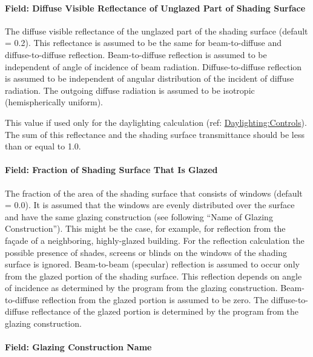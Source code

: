 \paragraph{Field: Diffuse Visible Reflectance of Unglazed Part of Shading Surface}\label{field-diffuse-visible-reflectance-of-unglazed-part-of-shading-surface}

The diffuse visible reflectance of the unglazed part of the shading surface (default = 0.2). This reflectance is assumed to be the same for beam-to-diffuse and diffuse-to-diffuse reflection. Beam-to-diffuse reflection is assumed to be independent of angle of incidence of beam radiation. Diffuse-to-diffuse reflection is assumed to be independent of angular distribution of the incident of diffuse radiation. The outgoing diffuse radiation is assumed to be isotropic (hemispherically uniform).

This value if used only for the daylighting calculation (ref: \hyperref[daylightingcontrols-000]{Daylighting:Controls}). The sum of this reflectance and the shading surface transmittance should be less than or equal to 1.0.

\paragraph{Field: Fraction of Shading Surface That Is Glazed}\label{field-fraction-of-shading-surface-that-is-glazed}

The fraction of the area of the shading surface that consists of windows (default = 0.0). It is assumed that the windows are evenly distributed over the surface and have the same glazing construction (see following ``Name of Glazing Construction''). This might be the case, for example, for reflection from the façade of a neighboring, highly-glazed building. For the reflection calculation the possible presence of shades, screens or blinds on the windows of the shading surface is ignored. Beam-to-beam (specular) reflection is assumed to occur only from the glazed portion of the shading surface. This reflection depends on angle of incidence as determined by the program from the glazing construction. Beam-to-diffuse reflection from the glazed portion is assumed to be zero. The diffuse-to-diffuse reflectance of the glazed portion is determined by the program from the glazing construction.

\paragraph{Field: Glazing Construction Name}\label{field-glazing-construction-name}


